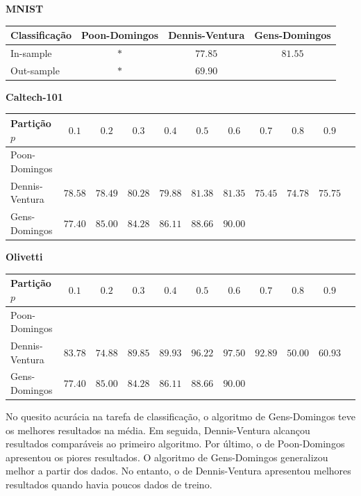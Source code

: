\documentclass[12pt]{article}
\theoremstyle{plain}
\numberwithin{equation}{section}
\begin{document}
\begin{table}[h]
  \centering\textbf{MNIST}\vspace{0.25cm}\\
  \begin{tabular}{l|ccc}
    Classificação & Poon-Domingos & Dennis-Ventura & Gens-Domingos \\
    \hline
    In-sample & $\ast$ & $77.85$ & $81.55$ \\
    Out-sample & $\ast$ & $69.90$ & \\
  \end{tabular}
\end{table}

\begin{table}[h]
  \centering\textbf{Caltech-101}\vspace{0.25cm}\\
  \begin{tabular}{l|cccccccccc}
    Partição $p$ & $0.1$ & $0.2$ & $0.3$ & $0.4$ & $0.5$ & $0.6$ & $0.7$ & $0.8$ & $0.9$\\
    \hline
    Poon-Domingos & & & & & & & & &\\
    Dennis-Ventura & $78.58$ & $78.49$ & $80.28$ & $79.88$ & $81.38$ & $81.35$ & $75.45$ & $74.78$ & $75.75$\\
    Gens-Domingos & $77.40$ & $85.00$ & $84.28$ & $86.11$ & $88.66$ & $90.00$ & & &\\
  \end{tabular}
\end{table}

\begin{table}[h]
  \centering\textbf{Olivetti}\vspace{0.25cm}\\
  \begin{tabular}{l|cccccccccc}
    Partição $p$ & $0.1$ & $0.2$ & $0.3$ & $0.4$ & $0.5$ & $0.6$ & $0.7$ & $0.8$ & $0.9$\\
    \hline
    Poon-Domingos & & & & & & & & &\\
    Dennis-Ventura & $83.78$ & $74.88$ & $89.85$ & $89.93$ & $96.22$ & $97.50$ & $92.89$ & $50.00$ & $60.93$\\
    Gens-Domingos & $77.40$ & $85.00$ & $84.28$ & $86.11$ & $88.66$ & $90.00$ & & &\\
  \end{tabular}
\end{table}

No quesito acurácia na tarefa de classificação, o algoritmo de Gens-Domingos teve os melhores
resultados na média. Em seguida, Dennis-Ventura alcançou resultados comparáveis ao primeiro
algoritmo. Por último, o de Poon-Domingos apresentou os piores resultados. O algoritmo de
Gens-Domingos generalizou melhor a partir dos dados. No entanto, o de Dennis-Ventura apresentou
melhores resultados quando havia poucos dados de treino.
\end{document}
